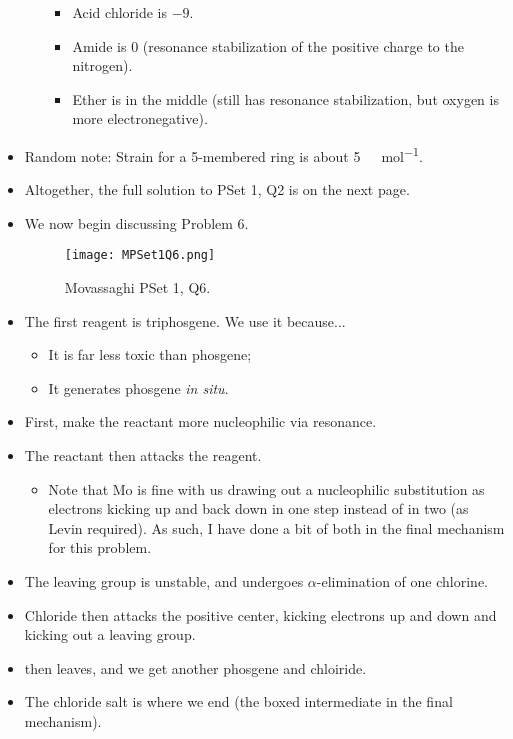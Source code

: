 \documentclass[../notes.tex]{subfiles}
\begin{document}
\begin{itemize}
\begin{itemize}
\begin{itemize}
            \item Acid chloride is $-9$.
            \item Amide is $0$ (resonance stabilization of the positive charge to the nitrogen).
            \item Ether is in the middle (still has resonance stabilization, but oxygen is more electronegative).
        \end{itemize}
    \end{itemize}
    \item Random note: Strain for a 5-membered ring is about \SI{5}{\kilo\calorie\per\mole}.
    \item Altogether, the full solution to PSet 1, Q2 is on the next page.
    
    \item We now begin discussing Problem 6.
    \begin{figure}[h!]
        \centering
        \texttt{[image: MPSet1Q6.png]}
        \caption{Movassaghi PSet 1, Q6.}
        \label{fig:MPSet1Q6}
    \end{figure}
    \item The first reagent is triphosgene. We use it because...
    \begin{itemize}
        \item It is far less toxic than phosgene;
        \item It generates phosgene \emph{in situ}.
    \end{itemize}
    \item First, make the reactant more nucleophilic via resonance.
    \item The reactant then attacks the reagent.
    \begin{itemize}
        \item Note that Mo is fine with us drawing out a nucleophilic substitution as electrons kicking up and back down in one step instead of in two (as Levin required). As such, I have done a bit of both in the final mechanism for this problem.
    \end{itemize}
    \item The leaving group is unstable, and undergoes $\alpha$-elimination of one chlorine.
    \item Chloride then attacks the positive center, kicking electrons up and down and kicking out a leaving group.
    \item {} then leaves, and we get another phosgene and chloiride.
    \item The chloride salt is where we end (the boxed intermediate in the final mechanism).

\end{itemize}
\end{document}
